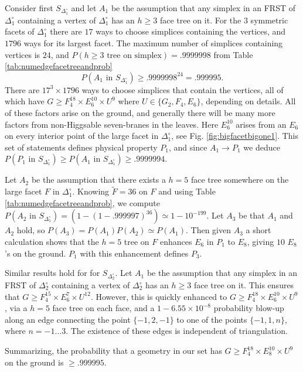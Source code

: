 \documentclass[aps,prl,twocolumn, superscriptaddress,groupedaddress,nofootinbib]{revtex4-1}
\newcommand{\sdoc}{S_{\Delta_1^\circ}}
\newcommand{\sdtc}{S_{\Delta_2^\circ}}
\newcommand{\doc}{{\Delta_1^\circ}}
\newcommand{\dtc}{{\Delta_2^\circ}}
\newcommand{\textin}{\,\, \text{in} \,\,}
\begin{document}
Consider first $\sdoc$ and let $A_1$ be the assumption that any simplex in an FRST 
of $\doc$ containing a vertex of $\doc$ has an $h\geq 3$ face tree on it. 
For the $3$ symmetric facets of $\doc$ there are $17$ ways to choose simplices
containing the vertices, and $1796$ ways for its largest facet. The maximum
number of simplices containing vertices is $24$, and $P(h\geq 3 \,\, \text{tree on simplex}) = .9999998$ from Table \ref{tab:numedgefacetreeandprob}
\begin{equation}
P(A_1\textin\sdoc)\geq .9999998^{24}=.999995.
\end{equation}
There are $17^3\times1796$ ways to choose simplices that contain the vertices,
all of which have $G\geq F_4^{18}\times E_6^{10}\times U^9$ where 
$U\in\{G_2,F_4,E_6\}$, depending on details. All of these factors arise on
the ground, and generally there will be many more factors from non-Higgsable seven-branes
in the leaves. Here $E_6^{10}$ arises from an $E_6$ on every interior point
of the large facet in $\doc$, see Fig. \ref{fig:bigfacetbigone1}. This set of
statements defines physical property $P_1$, and since $A_1\to P_1$
we deduce $P(P_1\textin \sdoc)\geq P(A_1\textin \sdoc) \geq .9999994$.

Let $A_2$ be the assumption that there exists a $h=5$ face tree somewhere
on the large facet $F$ in $\doc$. Knowing $\tilde F=36$ on $F$ and using
Table \ref{tab:numedgefacetreeandprob}, we compute $P(A_2 \textin \sdoc)=(1-(1-.999997)^{36})\simeq 1-10^{-199}.$ Let $A_3$ be that $A_1$ and $A_2$ hold, so 
$P(A_3)=P(A_1)P(A_2)\simeq P(A_1)$. Then given $A_3$ a short calculation shows 
that the  $h=5$ tree on $F$ 
enhances $E_6$ in $P_1$ to $E_8$, giving $10$ $E_8$'s on the ground. $P_1$ with this enhancement defines $P_3$. 

Similar results hold for for $\sdtc$. Let $A_1$ be the assumption that any simplex in an FRST 
of $\dtc$ containing a vertex of $\dtc$ has an $h\geq 3$ face tree on it. This ensures that $G\geq F_4^{15}\times E_6^{7}\times U^{12}$. However, this is quickly enhanced to  $G\geq F_4^{18}\times E_6^{10}\times U^9$, via a $h=5$ face tree on each face, and a $1-6.55\times 10^{-8}$ probability blow-up along an edge connecting the point $\{-1, 2, -1\}$ to one of the points $\{-1, 1, n\}$, where $n = -1\dots 3$. The existence of these edges is independent of triangulation.

Summarizing, the probability that a geometry in our set has
$G\geq F_4^{18}\times E_8^{10}\times U^9$ on the ground is $\geq .999995$.
\end{document}
